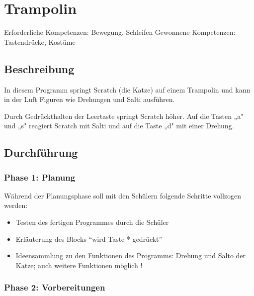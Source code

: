 \section{Trampolin}\label{trampolin}

Erforderliche Kompetenzen: Bewegung, Schleifen Gewonnene Kompetenzen:
Tastendrücke, Kostüme

\begin{figure}[ht]
    \centering 
    \caption[\Sectionname]{\Sectionname}
\end{figure}

\subsection{Beschreibung}\label{beschreibung}

In diesem Programm springt Scratch (die Katze) auf einem Trampolin und
kann in der Luft Figuren wie Drehungen und Salti ausführen.

Durch Gedrückthalten der Leertaste springt Scratch höher. Auf die Tasten
„a" und „s" reagiert Scratch mit Salti und auf die Taste „d" mit einer
Drehung.

\subsection{Durchführung}\label{durchfuxfchrung}

\subsubsection{Phase 1: Planung}\label{phase-1-planung}

Während der Planungsphase soll mit den Schülern folgende Schritte
vollzogen werden:

\begin{itemize}
\item
  Testen des fertigen Programmes durch die Schüler
\item
  Erläuterung des Blocks ``wird Taste * gedrückt''
\item
  Ideensammlung zu den Funktionen des Programms: Drehung und Salto der
  Katze; auch weitere Funktionen möglich !
\end{itemize}

\subsubsection{Phase 2: Vorbereitungen}\label{phase-2-vorbereitungen}

